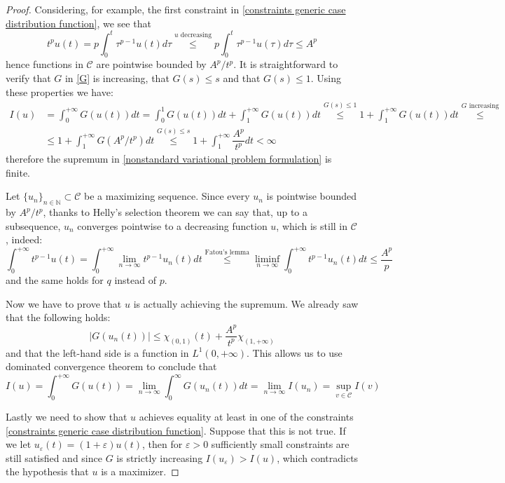 \documentclass[corpo=11pt, stile=classica, tipotesi=custom,
greek, evenboxes, english]{toptesi}
\numberwithin{equation}{chapter}
\newcommand{\N}{\mathbb{N}} %
\begin{document}
\begin{proof}
	Considering, for example, the first constraint in \eqref{constraints generic case distribution function}, we see that
	\begin{equation*}
		t^p u(t) = p \int_0^t \tau^{p-1} u(t) d\tau \overset{u \text{ decreasing}}{\leq} p \int_0^t \tau^{p-1} u(\tau) d\tau \leq A^p
	\end{equation*}
	hence functions in $\mathcal{C}$ are pointwise bounded by $A^p/t^p$. It is straightforward to verify that $G$ in \eqref{G} is increasing, that $G(s) \leq s$ and that $G(s) \leq 1$. Using these properties we have:
	\begin{align*}
		I(u) &= \int_0^{+\infty} G(u(t))dt = \int_0^1 G(u(t))dt + \int_1^{+\infty} G(u(t))dt \overset{G(s) \leq 1}{\leq} 1 + \int_1^{+\infty} G(u(t))dt \overset{G \text{ increasing}}{\leq}\\ &\leq 1 + \int_1^{+\infty} G(A^p/t^p)dt \overset{G(s) \leq s}{\leq} 1 + \int_1^{+\infty} \dfrac{A^p}{t^p}dt < \infty
	\end{align*}
	therefore the supremum in \eqref{nonstandard variational problem formulation} is finite.
	
	Let $\{u_n\}_{n \in \N} \subset \mathcal{C}$ be a maximizing sequence. Since every $u_n$ is pointwise bounded by $A^p/t^p$, thanks to {\color{red}Helly's selection theorem} we can say that, up to a subsequence, $u_n$ converges pointwise to a decreasing function $u$, which is still in $\mathcal{C}$, indeed:
	\begin{equation*}
		\int_0^{+\infty} t^{p-1} u(t) = \int_0^{+\infty} \lim_{n \rightarrow \infty} t^{p-1} u_n(t) dt \overset{\text{Fatou's lemma}}{\leq} \liminf_{n \rightarrow \infty} \int_0^{+\infty} t^{p-1} u_n(t) dt \leq \dfrac{A^p}{p}
	\end{equation*}
	and the same holds for $q$ instead of $p$.
	
	Now we have to prove that $u$ is actually achieving the supremum. We already saw that the following holds:
	\begin{equation*}
		|G(u_n(t))| \leq \chi_{(0,1)}(t) + \dfrac{A^p}{t^p} \chi_{(1,+\infty)}
	\end{equation*}
	and that the left-hand side is a function in $L^1(0,+\infty)$. This allows us to use dominated convergence theorem to conclude that 
	\begin{equation*}
		I(u) = \int_0^{+\infty} G(u(t)) = \lim_{n \rightarrow \infty} \int_0^{\infty} G(u_n(t))dt = \lim_{n \rightarrow \infty} I(u_n) = \sup_{v \in \mathcal{C}} I(v)
	\end{equation*}

	Lastly we need to show that $u$ achieves equality at least in one of the constraints \eqref{constraints generic case distribution function}. Suppose that this is not true. If we let $u_{\varepsilon}(t) = (1+\varepsilon) u(t)$, then for $\varepsilon > 0$ sufficiently small constraints are still satisfied and since $G$ is strictly increasing $I(u_{\varepsilon}) > I(u)$, which contradicts the hypothesis that $u$ is a maximizer.
\end{proof}
\end{document}
